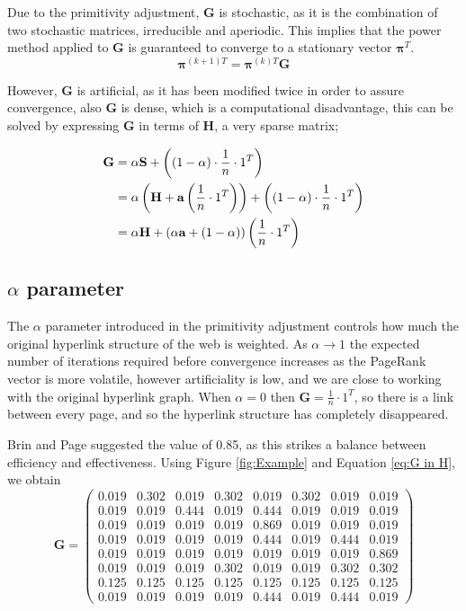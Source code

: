 \documentclass[11pt]{report}
\begin{document}
Due to the primitivity adjustment, \textbf{G} is stochastic, as it is the combination of two stochastic matrices, irreducible and aperiodic. This implies that the power method applied to \textbf{G} is guaranteed to converge to a stationary vector $\boldsymbol{\pi}^T$.
\begin{equation}\label{eq:power to G}
\boldsymbol{\pi}^{(k+1)T} = \boldsymbol{\pi}^{(k)T}\textbf{G}
\end{equation} 

However, \textbf{G} is artificial, as it has been modified twice in order to assure convergence, also \textbf{G} is dense, which is a computational disadvantage, this can be solved by expressing \textbf{G} in terms of \textbf{H}, a very sparse matrix; 
 
\begin{align}
\textbf{G} & = \alpha\textbf{S}+\left((1-\alpha)\cdot\frac{1}{n}\cdot1^T\right)\notag\\
& = \alpha \left(\textbf{H} + \textbf{a}\left(\frac{1}{n}\cdot 1^{T}\right)\right) + \left((1-\alpha)\cdot\frac{1}{n}\cdot1^T\right)\notag\\
& = \alpha\textbf{H} + (\alpha\textbf{a} +(1-\alpha))\left(\frac{1}{n}\cdot 1^T\right)\label{eq:G in H}
\end{align} 

\subsection{$\alpha$ parameter} \label{sec:alpha}
The $\alpha$ parameter introduced in the primitivity adjustment controls how much the original hyperlink structure of the web is weighted. As $\alpha \rightarrow 1$ the expected number of iterations required before convergence increases as the PageRank vector is more volatile, however artificiality is low, and we are close to working with the original hyperlink graph. When $\alpha =0$ then $\textbf{G}=\frac{1}{n}\cdot 1^T$, so there is a link between every page, and so the hyperlink structure has completely disappeared. 

Brin and Page suggested the value of 0.85, as this strikes a balance between efficiency and effectiveness. Using Figure \ref{fig:Example} and Equation \eqref{eq:G in H}, we obtain
\begin{equation*}
\textbf{G} = \left(
\begin{array}{cccccccc}
0.019 & 0.302 & 0.019 & 0.302 & 0.019 & 0.302 & 0.019 & 0.019  \\
0.019 & 0.019 & 0.444 & 0.019 & 0.444 & 0.019 & 0.019 & 0.019  \\
0.019 & 0.019 & 0.019 & 0.019 & 0.869 & 0.019 & 0.019 & 0.019  \\
0.019 & 0.019 & 0.019 & 0.019 & 0.444 & 0.019 & 0.444 & 0.019  \\
0.019 & 0.019 & 0.019 & 0.019 & 0.019 & 0.019 & 0.019 & 0.869  \\
0.019 & 0.019 & 0.019 & 0.302 & 0.019 & 0.019 & 0.302 & 0.302  \\
0.125 & 0.125 & 0.125 & 0.125 & 0.125 & 0.125 & 0.125 & 0.125  \\
0.019 & 0.019 & 0.019 & 0.019 & 0.444 & 0.019 & 0.444 & 0.019 
\end{array}
\right)
\end{equation*}
\end{document}
